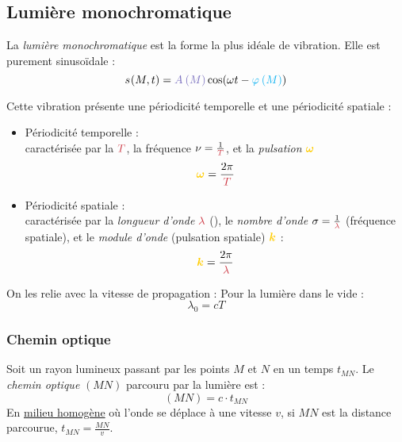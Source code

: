 \documentclass[11pt,a4paper,fleqn,pdftex]{report}
\begin{document}
\subsection{Lumière monochromatique} %
\label{sub:lumiere_monochromatique}
\begin{dfn}
    La \emph{lumière monochromatique} est la forme la plus idéale de vibration. Elle est \og{}purement\fg{} sinusoïdale : 
    \begin{equation}
    \vibration = \amplitude{M} \cos (\pulsation{}t - \phase{M})
    \end{equation}
\end{dfn}
Cette vibration présente une périodicité temporelle et une périodicité spatiale : 
\begin{itemize}
  \item Périodicité temporelle : \\
  caractérisée par la  $\textcolor{couleur4}{T}$, la fréquence $\nu = \frac{1}{\textcolor{couleur4}{T}}$, et la \emph{pulsation} $\textcolor{couleur5}{\boldsymbol{\pulsation}}$
  \[
    \textcolor{couleur5}{\boldsymbol{\pulsation}} = \dfrac{2\pi}{\textcolor{couleur4}{T}}
  \]
  \item Périodicité spatiale : \\
  caractérisée par la \emph{longueur d'onde} $\textcolor{couleur4}{\lambda}$ (), le \emph{nombre d'onde} $\sigma = \frac{1}{\textcolor{couleur4}{\lambda}}$ (fréquence spatiale), et le \emph{module d'onde} (pulsation spatiale) $\textcolor{couleur5}{\boldsymbol{k}}$ :
  \[
    \textcolor{couleur5}{\boldsymbol{k}} = \frac{2\pi}{\textcolor{couleur4}{\lambda}}
  \]
\end{itemize}
On les relie avec la vitesse de propagation : \newline
Pour la lumière dans le vide : 
\begin{equation}
\lambda_0 = c T
\end{equation}
\subsubsection{Chemin optique} %
\label{ssub:chemin_optique}
\begin{dfn}
   Soit un rayon lumineux passant par les points $M$ et $N$ en un temps $t_{MN}$. Le \emph{chemin optique} $(MN)$ parcouru par la lumière est :
   \begin{equation}
   (MN) = c\cdot t_{MN}
   \end{equation}
   En \uline{milieu homogène} où l'onde se déplace à une vitesse $v$, si $MN$ est la distance parcourue, $t_{MN}=\frac{MN}{v}$.
\end{dfn}
\end{document}
